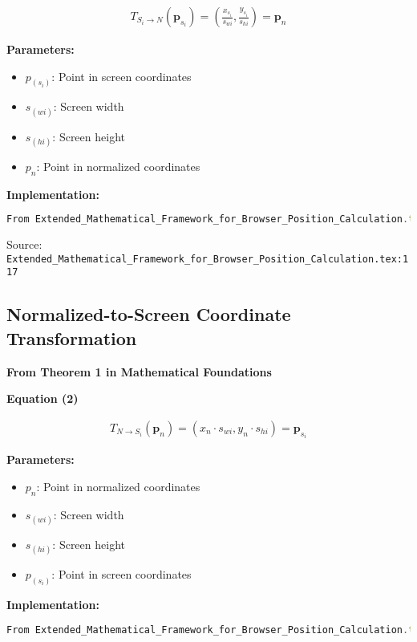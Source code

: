 \documentclass{article}
\begin{document}
\begin{align}
T_{S_i \to N}(\bm{p}_{s_i}) = \left(\frac{x_{s_i}}{s_{wi}}, \frac{y_{s_i}}{s_{hi}}\right) = \bm{p}_n
\end{align}

\textbf{Parameters:}

\begin{itemize}
\item $p_(s_i)$: Point in screen coordinates
\item $s_(wi)$: Screen width
\item $s_(hi)$: Screen height
\item $p_n$: Point in normalized coordinates
\end{itemize}

\textbf{Implementation:}

\begin{lstlisting}[language=TypeScript, basicstyle=\small\ttfamily]
From Extended_Mathematical_Framework_for_Browser_Position_Calculation.tex
\end{lstlisting}

Source: \texttt{Extended_Mathematical_Framework_for_Browser_Position_Calculation.tex:117}

\subsection{Normalized-to-Screen Coordinate Transformation}

\textbf{From Theorem 1 in Mathematical Foundations}

\textbf{Equation (2)}

\begin{align}
T_{N \to S_i}(\bm{p}_n) = (x_n \cdot s_{wi}, y_n \cdot s_{hi}) = \bm{p}_{s_i}
\end{align}

\textbf{Parameters:}

\begin{itemize}
\item $p_n$: Point in normalized coordinates
\item $s_(wi)$: Screen width
\item $s_(hi)$: Screen height
\item $p_(s_i)$: Point in screen coordinates
\end{itemize}

\textbf{Implementation:}

\begin{lstlisting}[language=TypeScript, basicstyle=\small\ttfamily]
From Extended_Mathematical_Framework_for_Browser_Position_Calculation.tex
\end{lstlisting}
\end{document}
